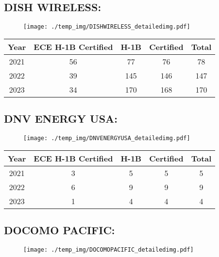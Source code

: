 \documentclass{article}%
\begin{document}
%
\newpage%
\subsection{DISH WIRELESS:}%
\label{subsec:DISHWIRELESS}%
\label{DISHWIRELESSdetailed}%


\begin{figure}[htbp]%
\centering%
\texttt{[image: ./temp\_img/DISHWIRELESS\_detailedimg.pdf]}%
\end{figure}

%
\begin{longtable}{c|c|c|c|c}%
\hline%
Year&ECE H{-}1B Certified&H{-}1B&Certified&Total\\%
\hline%
2021&56&77&76&78\\%
\hline%
2022&39&145&146&147\\%
\hline%
2023&34&170&168&170\\%
\hline%
\end{longtable}

%
\newpage%
\subsection{DNV ENERGY USA:}%
\label{subsec:DNVENERGYUSA}%
\label{DNVENERGYUSAdetailed}%


\begin{figure}[htbp]%
\centering%
\texttt{[image: ./temp\_img/DNVENERGYUSA\_detailedimg.pdf]}%
\end{figure}

%
\begin{longtable}{c|c|c|c|c}%
\hline%
Year&ECE H{-}1B Certified&H{-}1B&Certified&Total\\%
\hline%
2021&3&5&5&5\\%
\hline%
2022&6&9&9&9\\%
\hline%
2023&1&4&4&4\\%
\hline%
\end{longtable}

%
\newpage%
\subsection{DOCOMO PACIFIC:}%
\label{subsec:DOCOMOPACIFIC}%
\label{DOCOMOPACIFICdetailed}%


\begin{figure}[htbp]%
\centering%
\texttt{[image: ./temp\_img/DOCOMOPACIFIC\_detailedimg.pdf]}%
\end{figure}
\end{document}
